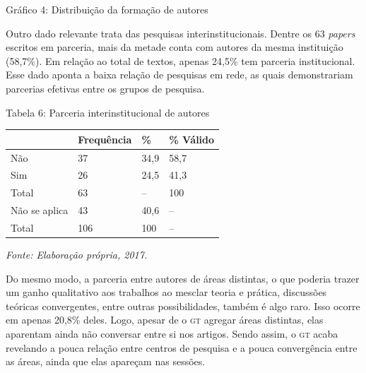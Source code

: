 \begin{center}
Gráfico 4: Distribuição da formação de autores
\end{center}


Outro dado relevante trata das pesquisas interinstitucionais. Dentre os
63 \emph{papers} escritos em parceria, mais da metade conta com
autores da mesma instituição (58,7\%). Em relação ao total de textos,
apenas 24,5\% tem parceria institucional. Esse dado aponta a baixa
relação de pesquisas em rede, as quais demonstrariam parcerias efetivas
entre os grupos de pesquisa.

\begin{center}
Tabela 6: Parceria interinstitucional de autores
\end{center}

\begin{center}
\centering
\begin{tabular}{|l|l|l|l|}
\hline
 & \textbf{Frequência} & \textbf{\%} & \textbf{\% Válido} \\ \hline
Não & 37 & 34,9 & 58,7 \\ \hline
Sim & 26 & 24,5 & 41,3 \\ \hline
Total & 63 & -- & 100 \\ \hline
Não se aplica & 43 & 40,6 & -- \\ \hline
Total & 106 & 100 & -- \\ \hline
\end{tabular}
\end{center}

\begin{center}
{\footnotesize\emph{Fonte: Elaboração própria, 2017.}}
\end{center}

Do mesmo modo, a parceria entre autores de áreas distintas, o que
poderia trazer um ganho qualitativo aos trabalhos ao mesclar teoria e
prática, discussões teóricas convergentes, entre outras possibilidades,
também é algo raro. Isso ocorre em apenas 20,8\% deles. Logo, apesar de
o \textsc{gt} agregar áreas distintas, elas aparentam ainda não conversar entre
si nos artigos. Sendo assim, o \textsc{gt} acaba revelando a pouca relação entre
centros de pesquisa e a pouca convergência entre as áreas, ainda que
elas apareçam nas sessões.

